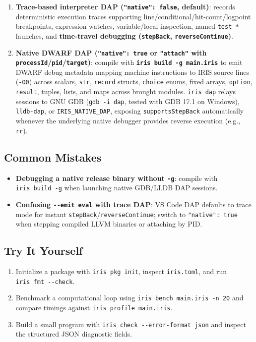 \documentclass[
  english,
  oneside]{book}
\providecommand{\tightlist}{%
  \setlength{\itemsep}{0pt}\setlength{\parskip}{0pt}}
\begin{document}
\begin{enumerate}
\def\labelenumi{\arabic{enumi}.}
\tightlist
\item
  \textbf{Trace-based interpreter DAP (\texttt{"native":\ false},
  default)}: records deterministic execution traces supporting
  line/conditional/hit-count/logpoint breakpoints, expression watches,
  variable/local inspection, named \texttt{test\_*} launches, and
  \textbf{time-travel debugging (\texttt{stepBack},
  \texttt{reverseContinue})}.
\item
  \textbf{Native DWARF DAP (\texttt{"native":\ true} or
  \texttt{"attach"} with
  \texttt{processId}/\texttt{pid}/\texttt{target})}: compile with
  \textbf{\texttt{iris\ build\ -g\ main.iris}} to emit DWARF debug
  metadata mapping machine instructions to IRIS source lines
  (\texttt{-O0}) across scalars, \texttt{str}, \texttt{record} structs,
  \texttt{choice} enums, fixed arrays, \texttt{option}, \texttt{result},
  tuples, lists, and maps across brought modules. \texttt{iris\ dap}
  relays sessions to GNU GDB (\texttt{gdb\ -i\ dap}, tested with GDB
  17.1 on Windows), \texttt{lldb-dap}, or \texttt{IRIS\_NATIVE\_DAP},
  exposing \texttt{supportsStepBack} automatically whenever the
  underlying native debugger provides reverse execution (e.g.,
  \texttt{rr}).
\end{enumerate}

\subsection{Common Mistakes}\label{common-mistakes-17}

\begin{itemize}
\tightlist
\item
  \textbf{Debugging a native release binary without \texttt{-g}}:
  compile with \texttt{iris\ build\ -g} when launching native GDB/LLDB
  DAP sessions.
\item
  \textbf{Confusing \texttt{-\/-emit\ eval} with trace DAP}: VS Code DAP
  defaults to trace mode for instant
  \texttt{stepBack}/\texttt{reverseContinue}; switch to
  \texttt{"native":\ true} when stepping compiled LLVM binaries or
  attaching by PID.
\end{itemize}

\subsection{Try It Yourself}\label{try-it-yourself-17}

\begin{enumerate}
\def\labelenumi{\arabic{enumi}.}
\tightlist
\item
  Initialize a package with \texttt{iris\ pkg\ init}, inspect
  \texttt{iris.toml}, and run \texttt{iris\ fmt\ -\/-check}.
\item
  Benchmark a computational loop using
  \texttt{iris\ bench\ main.iris\ -n\ 20} and compare timings against
  \texttt{iris\ profile\ main.iris}.
\item
  Build a small program with
  \texttt{iris\ check\ -\/-error-format\ json} and inspect the
  structured JSON diagnostic fields.
\end{enumerate}
\end{document}
